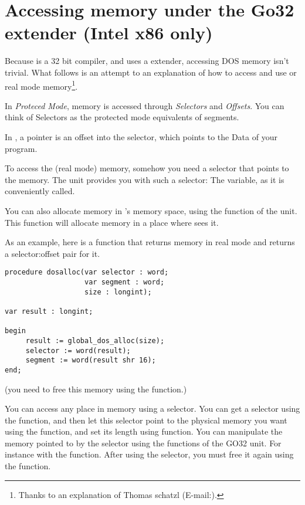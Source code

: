 \documentclass{report}
\begin{document}
\section{Accessing \dos memory under the Go32 extender (Intel x86 only) }
\label{se:AccessingDosMemory}

Because \fpc is a 32 bit compiler, and uses a \dos extender, accessing DOS
memory isn't trivial. What follows is an attempt to an explanation of how to
access and use \dos or real mode memory\footnote{Thanks to an explanation of
Thomas schatzl (E-mail:).}.

In {\em Proteced Mode}, memory is accessed through {\em Selectors} and
{\em Offsets}. You can think of Selectors as the protected mode
equivalents of segments.

In \fpc, a pointer is an offset into the  selector, which points to
the Data of your program.

To access the (real mode) \dos memory, somehow you need a selector that
points to the \dos memory.
The  unit provides you with such a selector: The
 variable, as it is conveniently called.

You can also allocate memory in \dos's memory space, using the
 function of the  unit.
This function will allocate memory in a place where \dos sees it.

As an example, here is a function that returns memory in real mode \dos and
returns a selector:offset pair for it.
\begin{verbatim}
procedure dosalloc(var selector : word;
                   var segment : word;
                   size : longint);

var result : longint;

begin
     result := global_dos_alloc(size);
     selector := word(result);
     segment := word(result shr 16);
end;
\end{verbatim}
(you need to free this memory using the  function.)

You can access any place in memory using a selector. You can get a selector
using the  function, and then let this selector
point to the physical memory you want using the
 function, and set its length using
 function.
You can manipulate the memory pointed to by the selector using the functions
of the GO32 unit. For instance with the  function.
After using the selector, you must free it again using the
 function.
\end{document}
